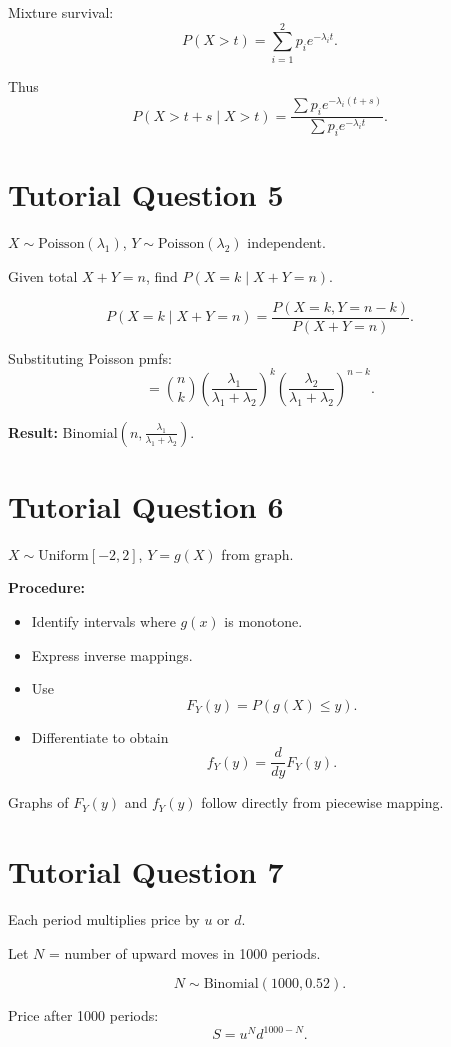 \documentclass[12pt]{article}
\begin{document}
Mixture survival:
\[
P(X>t)=\sum_{i=1}^2 p_i e^{-\lambda_i t}.
\]

Thus
\[
P(X>t+s\mid X>t)
=\frac{\sum p_i e^{-\lambda_i(t+s)}}
{\sum p_i e^{-\lambda_i t}}.
\]

\section*{Tutorial Question 5}

$X\sim \text{Poisson}(\lambda_1)$,  
$Y\sim \text{Poisson}(\lambda_2)$ independent.

Given total $X+Y=n$, find $P(X=k\mid X+Y=n)$.

\[
P(X=k\mid X+Y=n)
=\frac{P(X=k,Y=n-k)}{P(X+Y=n)}.
\]

Substituting Poisson pmfs:
\[
=\binom{n}{k}
\left(\frac{\lambda_1}{\lambda_1+\lambda_2}\right)^k
\left(\frac{\lambda_2}{\lambda_1+\lambda_2}\right)^{n-k}.
\]

\textbf{Result:} Binomial$(n,\frac{\lambda_1}{\lambda_1+\lambda_2})$.

\section*{Tutorial Question 6}

$X\sim \text{Uniform}[-2,2]$, $Y=g(X)$ from graph.

\textbf{Procedure:}
\begin{itemize}
\item Identify intervals where $g(x)$ is monotone.
\item Express inverse mappings.
\item Use
\[
F_Y(y)=P(g(X)\le y).
\]
\item Differentiate to obtain
\[
f_Y(y)=\frac{d}{dy}F_Y(y).
\]
\end{itemize}

Graphs of $F_Y(y)$ and $f_Y(y)$ follow directly from piecewise mapping.

\section*{Tutorial Question 7}

Each period multiplies price by $u$ or $d$.

Let $N$ = number of upward moves in 1000 periods.

\[
N\sim \text{Binomial}(1000,0.52).
\]

Price after 1000 periods:
\[
S=u^N d^{1000-N}.
\]
\end{document}

